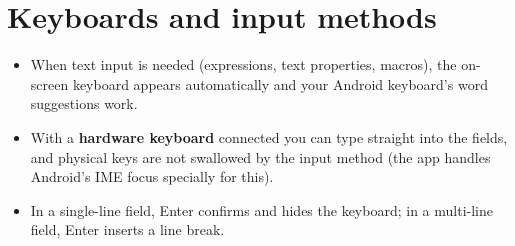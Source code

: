 \section{Keyboards and input methods}

\begin{itemize}
  \item When text input is needed (expressions, text properties, macros), the on-screen keyboard appears
        automatically and your Android keyboard's word suggestions work.
  \item With a \textbf{hardware keyboard} connected you can type straight into the fields, and physical keys
        are not swallowed by the input method (the app handles Android's IME focus specially for this).
  \item In a single-line field, Enter confirms and hides the keyboard; in a multi-line field, Enter inserts a
        line break.
\end{itemize}

